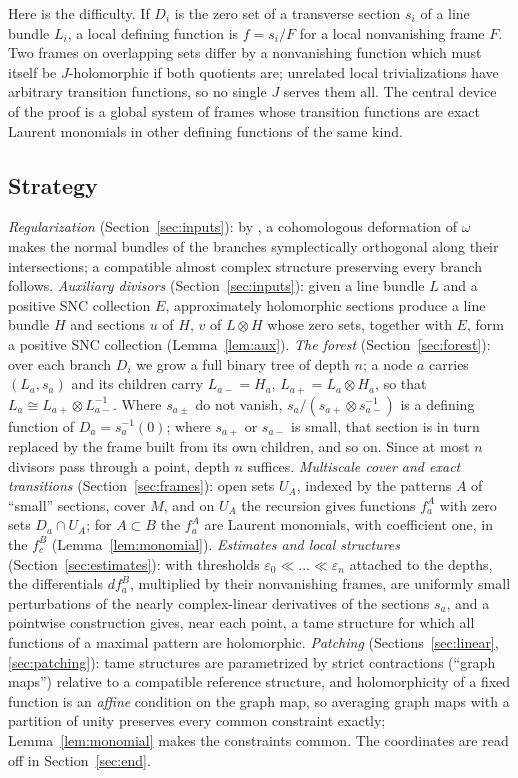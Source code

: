 \documentclass[11pt]{article}
\theoremstyle{remark}
\newcommand{\eps}{\varepsilon}
\begin{document}
Here is the difficulty. If $D_i$ is the zero set of a transverse
section $s_i$ of a line bundle $L_i$, a local defining function is
$f=s_i/F$ for a local nonvanishing frame $F$. Two frames on
overlapping sets differ by a nonvanishing function which must itself be
$J$-holomorphic if both quotients are; unrelated local trivializations
have arbitrary transition functions, so no single $J$ serves them all.
The central device of the proof is a global system of frames whose
transition functions are exact Laurent monomials in other defining
functions of the same kind.

\subsection*{Strategy}

\emph{Regularization} (Section~\ref{sec:inputs}): by
\cite[Theorem 2.13]{FMZ}, a cohomologous deformation of $\omega$ makes
the normal bundles of the branches symplectically orthogonal along
their intersections; a compatible almost complex structure preserving
every branch follows.
\emph{Auxiliary divisors} (Section~\ref{sec:inputs}): given a line
bundle $L$ and a positive SNC collection $E$, approximately holomorphic
sections \cite{Donaldson1996,Auroux1997,Mohsen2019} produce a line
bundle $H$ and sections $u$ of $H$, $v$ of $L\otimes H$ whose zero sets,
together with $E$, form a positive SNC collection (Lemma~\ref{lem:aux}).
\emph{The forest} (Section~\ref{sec:forest}): over each branch $D_i$ we
grow a full binary tree of depth $n$; a node $a$ carries $(L_a,s_a)$ and
its children carry $L_{a-}=H_a$, $L_{a+}=L_a\otimes H_a$, so that
$L_a\cong L_{a+}\otimes L_{a-}^{-1}$. Where $s_{a\pm}$ do not vanish,
$s_a/(s_{a+}\otimes s_{a-}^{-1})$ is a defining function of
$D_a=s_a^{-1}(0)$; where $s_{a+}$ or $s_{a-}$ is small, that section is
in turn replaced by the frame built from its own children, and so on.
Since at most $n$ divisors pass
through a point, depth $n$ suffices.
\emph{Multiscale cover and exact transitions} (Section~\ref{sec:frames}):
open sets $U_A$, indexed by the patterns $A$ of ``small'' sections,
cover $M$, and on $U_A$ the recursion gives functions $f^A_a$ with zero
sets $D_a\cap U_A$; for $A\subset B$ the $f^A_a$ are Laurent monomials,
with coefficient one, in the $f^B_c$ (Lemma~\ref{lem:monomial}).
\emph{Estimates and local structures} (Section~\ref{sec:estimates}):
with thresholds $\eps_0\ll\dots\ll\eps_n$ attached to the depths, the
differentials $df^B_a$, multiplied by their nonvanishing frames, are
uniformly small perturbations of the nearly complex-linear derivatives
of the sections $s_a$, and a pointwise construction gives, near each
point, a tame structure for which all functions of a maximal pattern
are holomorphic.
\emph{Patching} (Sections~\ref{sec:linear}, \ref{sec:patching}): tame
structures are parametrized by strict contractions (``graph maps'')
relative to a compatible reference structure, and holomorphicity of a fixed
function is an \emph{affine} condition on the graph map, so averaging
graph maps with a partition of unity preserves every common constraint
exactly; Lemma~\ref{lem:monomial} makes the constraints common. The
coordinates are read off in Section~\ref{sec:end}.
\end{document}
